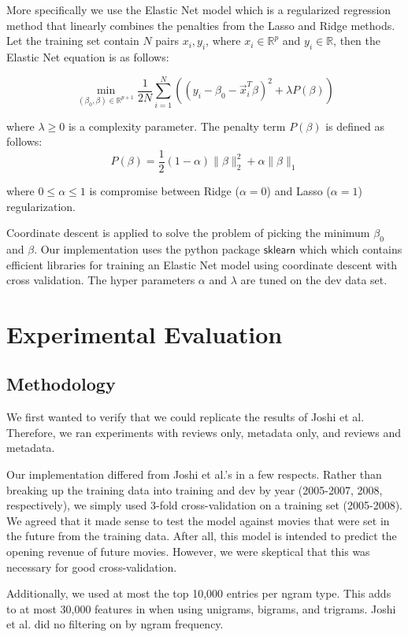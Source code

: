 \documentclass[11pt]{article}
\begin{document}
More specifically we use the Elastic Net model which is a regularized regression method
that linearly combines the penalties from the Lasso and Ridge methods. Let the training
set contain $N$ pairs $x_i,y_i$, where $x_i \in \mathbb{R}^p$ and $y_i \in \mathbb{R}$,
then the Elastic Net equation is as follows:

$$ \min_{(\beta_0, \beta) \in \mathbb{R}^{p+1}} \frac{1}{2N} \sum_{i=1}^N \left(
(y_i - \beta_0 - \vec{x}_i^T\beta)^2 + \lambda P(\beta)\right)$$

\noindent where $\lambda \geq 0$ is a complexity parameter. The penalty term $P(\beta)$
is defined as follows:
$$P(\beta) = \frac{1}{2}(1 - \alpha) \| \beta \|_2^2 + \alpha \|\beta\|_1$$

\noindent where $0 \leq \alpha \leq 1$ is compromise between Ridge ($\alpha = 0$) and
Lasso ($\alpha = 1$) regularization.

Coordinate descent is applied to solve the problem of picking the minimum $\beta_0$ and
$\beta$. Our implementation uses the python package $\mathsf{sklearn}$ which which
contains efficient libraries for training an Elastic Net model using coordinate descent
with cross validation. The hyper parameters $\alpha$ and $\lambda$ are tuned on the dev
data set.

\section{Experimental Evaluation}
\subsection{Methodology}
We first wanted to verify that we could replicate the results of Joshi et al.
Therefore, we ran experiments with reviews only, metadata only, and reviews and metadata. 

Our implementation differed 
from Joshi et al.'s in a few respects. Rather than breaking up the training data into 
training and dev by year (2005-2007, 2008, respectively), we simply used
3-fold cross-validation on a training set (2005-2008). We agreed that it made sense
to test the model against movies that were set in the future from the training data.
After all, this model is intended to predict the opening revenue of future movies.
However, we were skeptical that this was necessary for good cross-validation.

Additionally, we used at most
the top 10,000 entries per ngram type. This adds to at most 30,000 features in when using
unigrams, bigrams, and trigrams. Joshi et al. did no filtering on 
by ngram frequency. 
\end{document}
